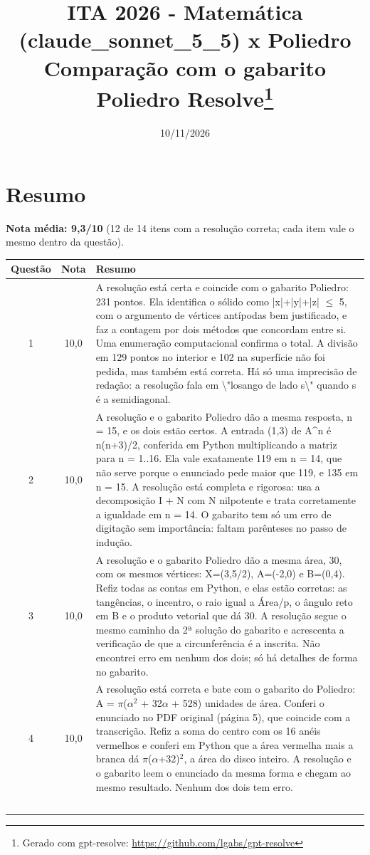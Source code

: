 \documentclass{article}%
\title{ITA 2026 {-} Matemática (claude\_sonnet\_5\_5) x Poliedro\\[4pt]\large Comparação com o gabarito Poliedro Resolve\thanks{Gerado com gpt-resolve: \url{https://github.com/lgabs/gpt-resolve}}}%
\date{10/11/2026}%
\begin{document}
%
\normalsize%
\maketitle%
\section*{Resumo}\textbf{Nota média: 9,3/10} (12 de 14 itens com a resolução correta; cada item vale o mesmo dentro da questão).\par\medskip%
\begin{longtable}{@{}c c p{}@{}}\toprule Questão & Nota & Resumo \\ \midrule
1 & 10,0 & A resolução está certa e coincide com o gabarito Poliedro: 231 pontos. Ela identifica o sólido como |x|+|y|+|z| $\leq$ 5, com o argumento de vértices antípodas bem justificado, e faz a contagem por dois métodos que concordam entre si. Uma enumeração computacional confirma o total. A divisão em 129 pontos no interior e 102 na superfície não foi pedida, mas também está correta. Há só uma imprecisão de redação: a resolução fala em \textbackslash{}"losango de lado s\textbackslash{}" quando s é a semidiagonal. \\
2 & 10,0 & A resolução e o gabarito Poliedro dão a mesma resposta, n = 15, e os dois estão certos. A entrada (1,3) de A\^{}n é n(n+3)/2, conferida em Python multiplicando a matriz para n = 1..16. Ela vale exatamente 119 em n = 14, que não serve porque o enunciado pede maior que 119, e 135 em n = 15. A resolução está completa e rigorosa: usa a decomposição I + N com N nilpotente e trata corretamente a igualdade em n = 14. O gabarito tem só um erro de digitação sem importância: faltam parênteses no passo de indução. \\
3 & 10,0 & A resolução e o gabarito Poliedro dão a mesma área, 30, com os mesmos vértices: X=(3,5/2), A=(-2,0) e B=(0,4). Refiz todas as contas em Python, e elas estão corretas: as tangências, o incentro, o raio igual a Área/p, o ângulo reto em B e o produto vetorial que dá 30. A resolução segue o mesmo caminho da 2ª solução do gabarito e acrescenta a verificação de que a circunferência é a inscrita. Não encontrei erro em nenhum dos dois; só há detalhes de forma no gabarito. \\
4 & 10,0 & A resolução está correta e bate com o gabarito do Poliedro: A = $\pi$($\alpha$$^2$ + 32$\alpha$ + 528) unidades de área. Conferi o enunciado no PDF original (página 5), que coincide com a transcrição. Refiz a soma do centro com os 16 anéis vermelhos e conferi em Python que a área vermelha mais a branca dá $\pi$($\alpha$+32)$^2$, a área do disco inteiro. A resolução e o gabarito leem o enunciado da mesma forma e chegam ao mesmo resultado. Nenhum dos dois tem erro. \\
$$
\end{longtable}
\end{document}
